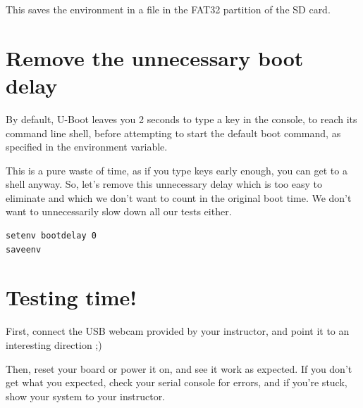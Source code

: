 This saves the environment in a  file in the FAT32
partition of the SD card.

\section{Remove the unnecessary boot delay}

By default, U-Boot leaves you 2 seconds to type a key in the console,
to reach its command line shell, before attempting to start the
default boot command, as specified in the  environment
variable.

This is a pure waste of time, as if you type keys early enough, you
can get to a shell anyway. So, let’s remove this unnecessary delay
which is too easy to eliminate and which we don’t want to count in
the original boot time. We don’t want to unnecessarily slow down
all our tests either.

\begin{verbatim}
setenv bootdelay 0
saveenv
\end{verbatim}

\section{Testing time!}

First, connect the USB webcam provided by your instructor, and point it
to an interesting direction ;)

Then, reset your board or power it on, and see it work as expected. If
you don't get what you expected, check your serial console for errors,
and if you're stuck, show your system to your instructor.

